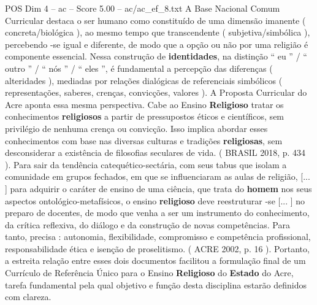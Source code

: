 \begin{textsample}{POS Dim 4 – ac – Score 5.00 – ac/ac\_ef\_8.txt}
A Base Nacional Comum Curricular destaca o ser humano como constituído de uma dimensão imanente ( concreta/biológica ), ao mesmo tempo que transcendente ( subjetiva/simbólica ), percebendo -se igual e diferente, de modo que a opção ou não por uma religião é componente essencial.
Nessa construção de \textbf{identidades}, na distinção “ eu ” / “ outro ” / “ nós ” / “ eles ”, é fundamental a percepção das diferenças ( alteridades ), mediadas por relações dialógicas de referenciais simbólicos ( representações, saberes, crenças, convicções, valores ).
A Proposta Curricular do Acre aponta essa mesma perspectiva.
Cabe ao Ensino \textbf{Religioso} tratar os conhecimentos \textbf{religiosos} a partir de pressupostos éticos e científicos, sem privilégio de nenhuma crença ou convicção.
Isso implica abordar esses conhecimentos com base nas diversas culturas e tradições \textbf{religiosas}, sem desconsiderar a existência de filosofias seculares de vida. ( BRASIL 2018, p. 434 ).
Para sair da tendência catequético-sectária, com seus tabus que isolam a comunidade em grupos fechados, em que se influenciaram as aulas de religião, [... ] para adquirir o caráter de ensino de uma ciência, que trata do \textbf{homem} nos seus aspectos ontológico-metafísicos, o ensino \textbf{religioso} deve reestruturar -se [... ] no preparo de docentes, de modo que venha a ser um instrumento do conhecimento, da crítica reflexiva, do diálogo e da construção de novas competências.
Para tanto, precisa : autonomia, flexibilidade, compromisso e competência profissional, responsabilidade ética e isenção de proselitismo. ( ACRE 2002, p. 16 ).
Portanto, a estreita relação entre esses dois documentos facilitou a formulação final de um Currículo de Referência Único para o Ensino \textbf{Religioso} do \textbf{Estado} do Acre, tarefa fundamental pela qual objetivo e função desta disciplina estarão definidos com clareza.

\end{textsample}
